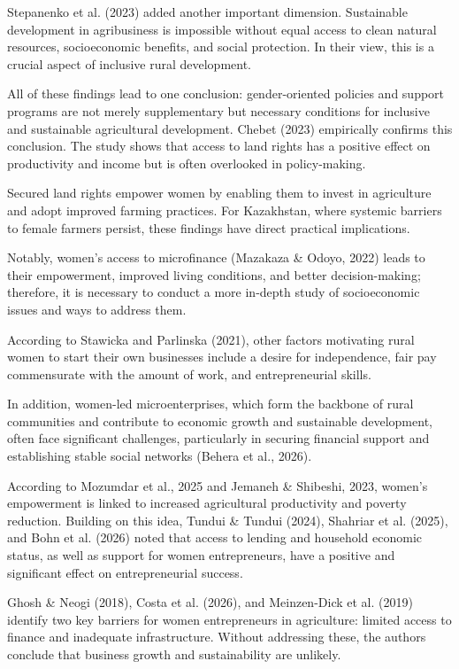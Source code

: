 \documentclass[
]{article}
\begin{document}
Stepanenko et al. (2023) added another important dimension. Sustainable
development in agribusiness is impossible without equal access to clean
natural resources, socioeconomic benefits, and social protection. In
their view, this is a crucial aspect of inclusive rural development.

All of these findings lead to one conclusion: gender-oriented policies
and support programs are not merely supplementary but necessary
conditions for inclusive and sustainable agricultural development.
Chebet (2023) empirically confirms this conclusion. The study shows that
access to land rights has a positive effect on productivity and income
but is often overlooked in policy-making.

Secured land rights empower women by enabling them to invest in
agriculture and adopt improved farming practices. For Kazakhstan, where
systemic barriers to female farmers persist, these findings have direct
practical implications.

Notably, women's access to microfinance (Mazakaza \& Odoyo, 2022) leads
to their empowerment, improved living conditions, and better
decision-making; therefore, it is necessary to conduct a more in-depth
study of socioeconomic issues and ways to address them.

According to Stawicka and Parlinska (2021), other factors motivating
rural women to start their own businesses include a desire for
independence, fair pay commensurate with the amount of work, and
entrepreneurial skills.

In addition, women-led microenterprises, which form the backbone of
rural communities and contribute to economic growth and sustainable
development, often face significant challenges, particularly in securing
financial support and establishing stable social networks (Behera et
al., 2026).

According to Mozumdar et al., 2025 and Jemaneh \& Shibeshi, 2023,
women's empowerment is linked to increased agricultural productivity and
poverty reduction. Building on this idea, Tundui \& Tundui (2024),
Shahriar et al. (2025), and Bohn et al. (2026) noted that access to
lending and household economic status, as well as support for women
entrepreneurs, have a positive and significant effect on entrepreneurial
success.

Ghosh \& Neogi (2018), Costa et al. (2026), and Meinzen-Dick et al.
(2019) identify two key barriers for women entrepreneurs in agriculture:
limited access to finance and inadequate infrastructure. Without
addressing these, the authors conclude that business growth and
sustainability are unlikely.
\end{document}
